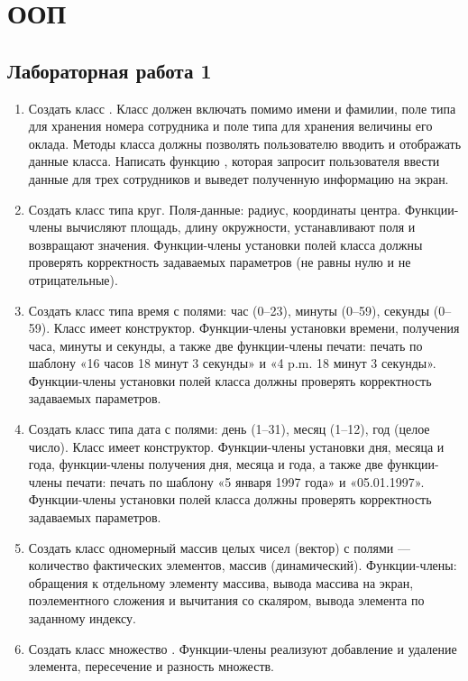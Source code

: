 \chapter{ООП}
\section{Лабораторная работа 1}
\begin{enumerate}[leftmargin=*]
    \item Создать класс . Класс должен включать помимо имени и фамилии, поле типа  для хранения номера сотрудника и поле типа  для хранения величины его оклада. Методы класса должны позволять пользователю вводить и отображать данные класса. Написать функцию , которая запросит пользователя ввести данные для трех сотрудников и выведет полученную информацию на экран.
    \item Создать класс типа круг. Поля-данные: радиус, координаты центра. Функции-члены вычисляют площадь, длину окружности, устанавливают поля и возвращают значения. Функции-члены установки полей класса должны проверять корректность задаваемых параметров (не равны нулю и не отрицательные).
    \item Создать класс типа время с полями: час (0–23), минуты (0–59), секунды (0–59). Класс имеет конструктор. Функции-члены установки времени, получения часа, минуты и секунды, а также две функции-члены печати: печать по шаблону «16 часов 18 минут 3 секунды» и «4 p.m. 18 минут 3 секунды». Функции-члены установки полей класса должны проверять корректность задаваемых параметров.
    \item Создать класс типа дата с полями: день (1–31), месяц (1–12), год (целое число). Класс имеет конструктор. Функции-члены установки дня, месяца и года, функции-члены получения дня, месяца и года, а также две функции-члены печати: печать по шаблону «5 января 1997 года» и «05.01.1997». Функции-члены установки полей класса должны проверять корректность задаваемых параметров.
    \item Создать класс одномерный массив целых чисел (вектор) с полями --- количество фактических элементов, массив (динамический). Функции-члены: обращения к отдельному элементу массива, вывода массива на экран, поэлементного сложения и вычитания со скаляром, вывода элемента по заданному индексу.
    \item Создать класс множество . Функции-члены реализуют добавление и удаление элемента, пересечение и разность множеств.
\end{enumerate}


